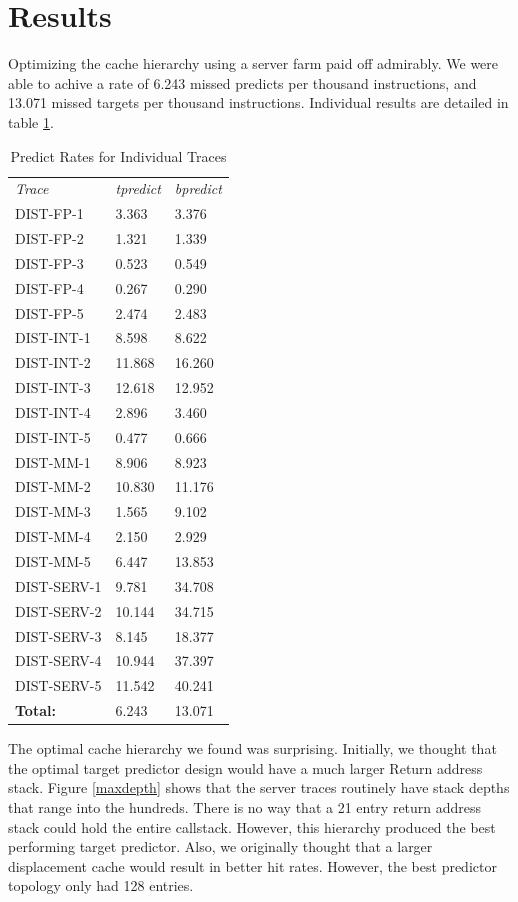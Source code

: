 \documentclass[twocolumn]{article}
\begin{document}
\section{Results}

Optimizing the cache hierarchy using a server farm paid off
admirably. We were able to achive a rate of 6.243 missed predicts per
thousand instructions, and 13.071 missed targets per thousand
instructions. Individual results are detailed in table \ref{bdibd}.


\begin{table}\begin{center}\begin{tabular}{lll}
\textit{Trace} & \textit{tpredict} & \textit{bpredict} \\
DIST-FP-1& 3.363 & 3.376 \\
DIST-FP-2& 1.321 & 1.339 \\
DIST-FP-3& 0.523 & 0.549 \\
DIST-FP-4& 0.267 & 0.290 \\
DIST-FP-5& 2.474 & 2.483 \\
DIST-INT-1& 8.598 & 8.622 \\
DIST-INT-2&11.868 &16.260 \\
DIST-INT-3&12.618 &12.952 \\
DIST-INT-4& 2.896 & 3.460 \\
DIST-INT-5& 0.477 & 0.666 \\
DIST-MM-1& 8.906 & 8.923 \\
DIST-MM-2&10.830 &11.176 \\
DIST-MM-3& 1.565 & 9.102 \\
DIST-MM-4& 2.150 & 2.929 \\
DIST-MM-5& 6.447 &13.853 \\
DIST-SERV-1& 9.781 &34.708 \\
DIST-SERV-2&10.144 &34.715 \\
DIST-SERV-3& 8.145 &18.377 \\
DIST-SERV-4&10.944 &37.397 \\
DIST-SERV-5&11.542 &40.241 \\
\hline
\textbf{Total:} & 6.243&13.071
\end{tabular}\end{center}
\caption{Predict Rates for Individual Traces}
\label{bdibd}
\end{table}

The optimal cache hierarchy we found was surprising. Initially, we
thought that the optimal target predictor design would have a much
larger Return address stack. Figure \ref{maxdepth} shows that the
server traces routinely have stack depths that range into the
hundreds. There is no way that a 21 entry return address stack could
hold the entire callstack. However, this hierarchy produced the best
performing target predictor. Also, we originally thought that a larger
displacement cache would result in better hit rates. However, the best
predictor topology only had 128 entries.
\end{document}

